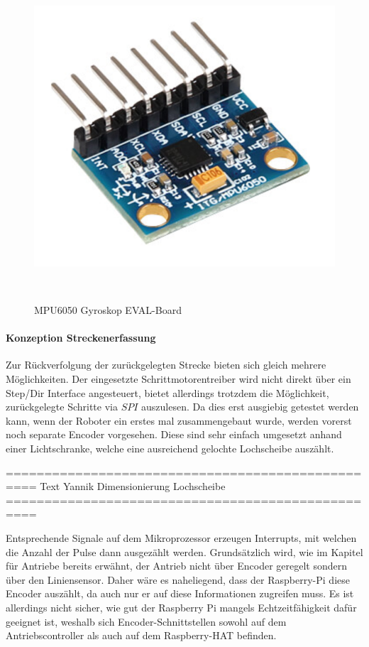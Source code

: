 \documentclass[main.tex]{subfiles} %
\begin{document}
\begin{figure}[h!]
    \centering
    \includegraphics[width=1\textwidth]{./fig_Strecken_Tracken/MPU6050.png}
    \caption{MPU6050 Gyroskop EVAL-Board}~\label{fig:MPU6050}
\end{figure}

\paragraph{Konzeption Streckenerfassung}
Zur Rückverfolgung der zurückgelegten Strecke bieten sich gleich mehrere
Möglichkeiten. Der eingesetzte Schrittmotorentreiber wird nicht direkt über ein
Step/Dir Interface angesteuert, bietet allerdings trotzdem die Möglichkeit,
zurückgelegte Schritte via $SPI$ auszulesen. Da dies erst ausgiebig getestet
werden kann, wenn der Roboter ein erstes mal zusammengebaut wurde, werden
vorerst noch separate Encoder vorgesehen. Diese sind sehr einfach umgesetzt
anhand einer Lichtschranke, welche eine ausreichend gelochte Lochscheibe
auszählt.

==================================================
Text Yannik Dimensionierung Lochscheibe
==================================================

Entsprechende Signale auf dem Mikroprozessor erzeugen Interrupts, mit welchen
die Anzahl der Pulse dann ausgezählt werden. Grundsätzlich wird, wie im Kapitel
für Antriebe bereits erwähnt, der Antrieb nicht über Encoder geregelt sondern
über den Liniensensor. Daher wäre es naheliegend, dass der Raspberry-Pi diese
Encoder auszählt, da auch nur er auf diese Informationen zugreifen muss. Es ist
allerdings nicht sicher, wie gut der Raspberry Pi mangels Echtzeitfähigkeit
dafür geeignet ist, weshalb sich Encoder-Schnittstellen sowohl auf dem
Antriebscontroller als auch auf dem Raspberry-HAT befinden.
\end{document}

